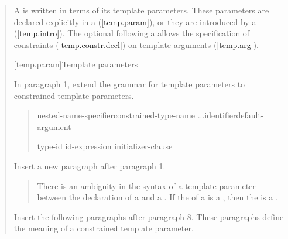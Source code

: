 \begin{quote}
\setcounter{Paras}{6}
\pnum
A  is written in terms of its template 
parameters. These parameters are declared explicitly in a 
 (\ref{temp.param}), or they are
introduced by a  (\ref{temp.intro}).
%
The optional  following a
 allows the specification of
constraints (\ref{temp.constr.decl}) on template arguments (\ref{temp.arg}).

[temp.param]{Template parameters}

In paragraph 1, extend the grammar for template parameters to 
constrained template parameters.

\begin{quote}
\pnum

\begin{bnf}
\br

\begin{addedblock}
\br
  nested-name-specifier\opt constrained-type-name ...\opt identifier\opt default-argument\opt\br

\br
  \terminal{=} type-id\br
  \terminal{=} id-expression\br
  \terminal{=} initializer-clause\br
\end{addedblock}
\end{bnf}
\end{quote}

Insert a new paragraph after paragraph 1.

\begin{quote}
\pnum
There is an ambiguity in the syntax of a template parameter between the
declaration of a  and a
.
% 
If the  of a  
is a , then the 
 is a .
\end{quote}

Insert the following paragraphs after paragraph 8. These paragraphs
define the meaning of a constrained template parameter.


\end{quote}
